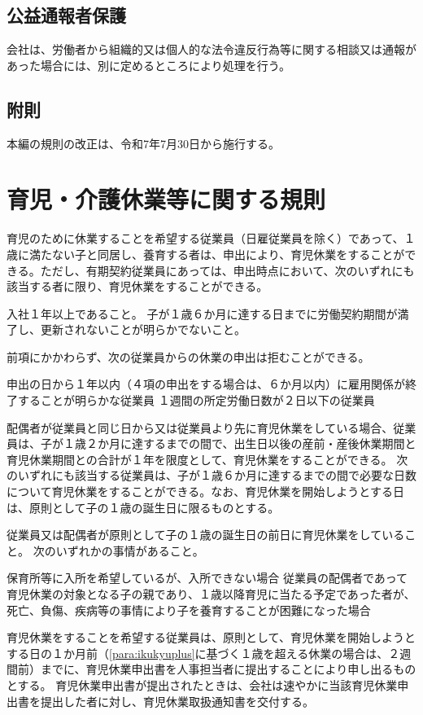 \documentclass[10pt,a4paper,uplatex]{jsarticle}
\begin{document}
\subsection{公益通報者保護}

会社は、労働者から組織的又は個人的な法令違反行為等に関する相談又は通報があった場合には、別に定めるところにより処理を行う。

\subsection*{附則}
本編の規則の改正は、令和7年7月30日から施行する。



\clearpage
\section{育児・介護休業等に関する規則}

育児のために休業することを希望する従業員（日雇従業員を除く）であって、１歳に満たない子と同居し、養育する者は、申出により、育児休業をすることができる。ただし、有期契約従業員にあっては、申出時点において、次のいずれにも該当する者に限り、育児休業をすることができる。
\label{para:ChildcareLayoff}
\begin{enumerate}
    \itm 入社１年以上であること。
    \itm 子が１歳６か月に達する日までに労働契約期間が満了し、更新されないことが明らかでないこと。
\end{enumerate}
\term 前項にかかわらず、次の従業員からの休業の申出は拒むことができる。
\begin{enumerate}
    \itm 申出の日から１年以内（４項の申出をする場合は、６か月以内）に雇用関係が終了することが明らかな従業員
    \itm １週間の所定労働日数が２日以下の従業員
\end{enumerate}
\term 配偶者が従業員と同じ日から又は従業員より先に育児休業をしている場合、従業員は、子が１歳２か月に達するまでの間で、出生日以後の産前・産後休業期間と育児休業期間との合計が１年を限度として、育児休業をすることができる。
\label{para:ikukyuplus}
\term 次のいずれにも該当する従業員は、子が１歳６か月に達するまでの間で必要な日数について育児休業をすることができる。なお、育児休業を開始しようとする日は、原則として子の１歳の誕生日に限るものとする。
\begin{enumerate}
    \itm 従業員又は配偶者が原則として子の１歳の誕生日の前日に育児休業をしていること。
    \itm 次のいずれかの事情があること。
    \begin{enumerate}
        \itm 保育所等に入所を希望しているが、入所できない場合
        \itm 従業員の配偶者であって育児休業の対象となる子の親であり、１歳以降育児に当たる予定であった者が、死亡、負傷、疾病等の事情により子を養育することが困難になった場合
    \end{enumerate}
\end{enumerate}
\term 育児休業をすることを希望する従業員は、原則として、育児休業を開始しようとする日の１か月前（\ref{para:ikukyuplus}に基づく１歳を超える休業の場合は、２週間前）までに、育児休業申出書を人事担当者に提出することにより申し出るものとする。
\term 育児休業申出書が提出されたときは、会社は速やかに当該育児休業申出書を提出した者に対し、育児休業取扱通知書を交付する。
\end{document}
